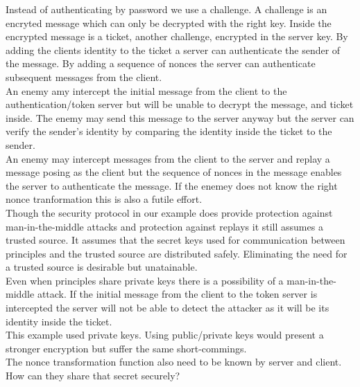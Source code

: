 Instead of authenticating by password we use a challenge. A challenge is an encryted message which can only be decrypted with the right key. Inside the encrypted message is a ticket, another challenge, encrypted in the server key. By adding the clients identity to the ticket a server can authenticate the sender of the message. By adding a sequence of nonces the server can authenticate subsequent messages from the client.\\

An enemy amy intercept the initial message from the client to the authentication/token server but will be unable to decrypt the message, and ticket inside. The enemy may send this message to the server anyway but the server can verify the sender's identity by comparing the identity inside the ticket to the sender. \\

An enemy may intercept messages from the client to the server and replay a message posing as the client but the sequence of nonces in the message enables the server to authenticate the message. If the enemey does not know the right nonce tranformation this is also a futile effort.\\

Though the security protocol in our example does provide protection against man-in-the-middle attacks and protection against replays it still assumes a trusted source. It assumes that the secret keys used for communication between principles and the trusted source are distributed safely. Eliminating the need for a trusted source is desirable but unatainable. \\

Even when principles share private keys there is a possibility of a man-in-the-middle attack. If the initial message from the client to the token server is intercepted the server will not be able to detect the attacker as it will be its identity inside the ticket. \\ 

This example used private keys. Using public/private keys would present a stronger encryption but suffer the same short-commings. \\

The nonce transformation function also need to be known by server and client. How can they share that secret securely?















